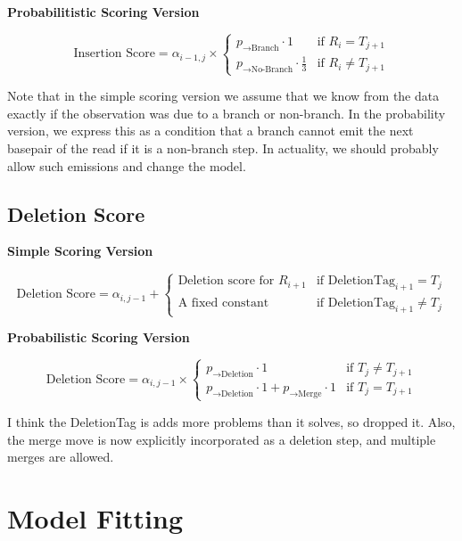 \documentclass[paper=a4, fontsize=11pt]{scrartcl}
\numberwithin{equation}{section}		%
\numberwithin{figure}{section}			%
\numberwithin{table}{section}				%
\begin{document}
\textbf{Probabilitistic Scoring Version}

\[
	\text{Insertion Score} = \alpha_{i-1,j}  \times  \begin{cases}
							 p_{\rightarrow \text{Branch}} \cdot 1   & \text{if }  R_{i} = T_{j+1} \\
							 p_{\rightarrow \text{No-Branch}}  \cdot \frac{1}{3} & \text{if }  R_{i}  \neq T_{j+1} 
							 \end{cases}
\]

Note that in the simple scoring version we assume that we know from the data exactly if the observation was due to a branch or non-branch.  In the probability version, we express this as a condition that a branch cannot emit the next basepair of the read if it is a non-branch step.  In actuality, we should probably allow such emissions and change the model.


\subsection{\textbf{Deletion Score}}

\textbf{Simple Scoring Version}

\[
	\text{Deletion Score} = \alpha_{i,j-1}  +  \begin{cases}
							 \text{Deletion score  for } R_{i+1}  & \text{if }  \text{DeletionTag}_{i+1} = T_{j} \\
							 \text{A fixed constant} & \text{if }  \text{DeletionTag}_{i+1} \neq T_{j} 
							 \end{cases}
\]

\textbf{Probabilistic Scoring Version}

\[
	\text{Deletion Score} = \alpha_{i,j-1}  \times  \begin{cases}
							 p_{ \rightarrow \text{Deletion}} \cdot 1 & \text{if }   T_{j} \neq T_{j+1} \\
							 p_{ \rightarrow \text{Deletion}} \cdot 1 + p_{\rightarrow \text{Merge}}  \cdot 1  & \text{if }  T_{j} = T_{j+1} 
	\end{cases}
\]

I think the DeletionTag is adds more problems than it solves, so dropped it.  Also, the merge move is now explicitly incorporated as a deletion step, and multiple merges are allowed.
 
 
\section{Model Fitting}
\end{document}
